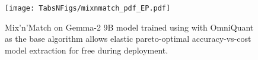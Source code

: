 \begin{figure}[!t]
  \centering
  \vspace{-2mm}
        \texttt{[image: TabsNFigs/mixnmatch\_pdf\_EP.pdf]}
        \vspace{-3mm}
        \caption{Mix'n'Match on Gemma-2 9B model trained using \epalg with OmniQuant as the base algorithm allows elastic pareto-optimal accuracy-vs-cost model extraction for free during deployment.}
\label{fig:omniquant-mnm-old}
\vspace*{-3mm}
\end{figure}